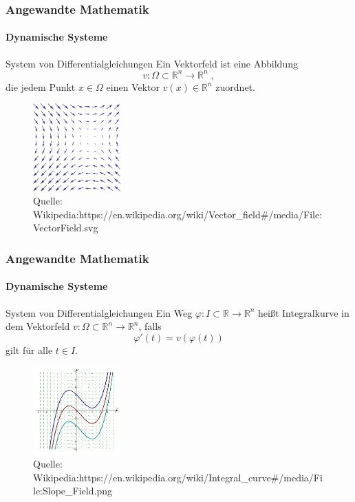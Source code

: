 \documentclass{beamer}
\begin{document}
\begin{frame}
    \frametitle{Angewandte Mathematik}
\framesubtitle{Dynamische Systeme }
\begin{block}{System von Differentialgleichungen}
Ein Vektorfeld ist eine Abbildung $$v : \Omega \subset \mathbb{R}^n \to \mathbb{R}^n \; ,$$ die jedem Punkt $x  \in \Omega$ einen Vektor $v(x) \in \mathbb{R}^n$ zuordnet.
\end{block}
\begin{figure}[H]
      \centering
    \includegraphics[width=0.3\textwidth]{images/480px-VectorField.png}
\caption{Quelle: Wikipedia:https://en.wikipedia.org/wiki/Vector\_field\#/media/File:VectorField.svg}
\end{figure}

 \end{frame}

\begin{frame}
    \frametitle{Angewandte Mathematik}
\framesubtitle{Dynamische Systeme }
\begin{block}{System von Differentialgleichungen}
Ein Weg $\varphi : I \subset \mathbb{R} \to \mathbb{R}^n$ heißt Integralkurve in dem Vektorfeld $v : \Omega \subset \mathbb{R}^n \to \mathbb{R}^n$, falls 
$$\varphi' (t) = v(\varphi(t))$$ gilt für alle $t \in  I$.
\end{block}
\begin{figure}[H]
      \centering
    \includegraphics[width=0.3\textwidth]{images/Slope_Field.png}
\caption{Quelle: Wikipedia:https://en.wikipedia.org/wiki/Integral\_curve\#/media/File:Slope\_Field.png}
\end{figure}

 \end{frame}
\end{document}
